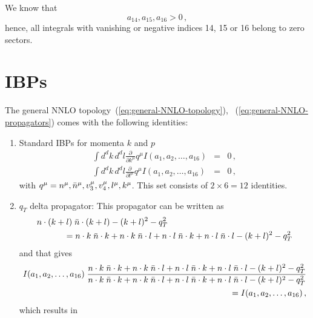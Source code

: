 \documentclass[a4paper,11pt]{report}
\numberwithin{equation}{section}
\begin{document}
We know that
%
\begin{equation}
 a_{14}, a_{15}, a_{16} > 0\,,
\end{equation}
%
hence, all integrals with vanishing or negative indices 14, 15 or 16 belong
to zero sectors.

\section{IBPs}

The general NNLO topology~(\ref{eq:general-NNLO-topology}),~
(\ref{eq:general-NNLO-propagators}) comes with the following identities:
 
\begin{enumerate}
  \item
  Standard IBPs for momenta $k$ and $p$
  \begin{eqnarray}
    \int d^dk\, d^d l \frac{\partial}{\partial k^\mu} q^\mu 
    I(a_1,a_2,\ldots, a_{16}) & = & 0\,, \\
    \int d^dk\, d^d l \frac{\partial}{\partial l^\mu} q^\mu 
    I(a_1,a_2,\ldots, a_{16}) & = & 0\,,
  \end{eqnarray}
  with $q^\mu = n^\mu, \bar{n}^\mu, v_3^\mu, v_4^\mu, l^\mu, k^\mu$. This set
  consists of $2 \times 6 = 12$ identities.
  \item
  $q_T$ delta propagator:
  This propagator can be written as 
  \begin{eqnarray}
    n\cdot (k+l)\; \nbar \cdot (k+l) - (k+l)^2 -q_T^2 & & 
    \nonumber \\
    &  &
    \hspace{-130pt}
    =
    n\cdot k\; \nbar \cdot k +
    n\cdot k\; \nbar \cdot l +
    n\cdot l\; \nbar \cdot k +
    n\cdot l\; \nbar \cdot l 
    - (k+l)^2 -q_T^2
  \end{eqnarray}
  and that gives
  \begin{eqnarray}
    I(a_1,a_2,\ldots, a_{16})\;
    \frac{
    n\cdot k\; \bar{n} \cdot k +
    n\cdot k\; \bar{n} \cdot l +
    n\cdot l\; \bar{n} \cdot k +
    n\cdot l\; \bar{n} \cdot l 
    - (k+l)^2 -q_T^2
    }{
    n\cdot k\; \bar{n} \cdot k +
    n\cdot k\; \bar{n} \cdot l +
    n\cdot l\; \bar{n} \cdot k +
    n\cdot l\; \bar{n} \cdot l 
    - (k+l)^2 -q_T^2
    }
    \nonumber \\
     = I(a_1,a_2,\ldots, a_{16})\,,
  \end{eqnarray}
  which results in 
  \begin{eqnarray}

\end{eqnarray}
\end{enumerate}
\end{document}
